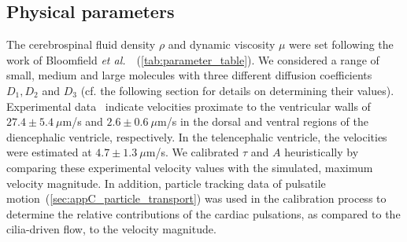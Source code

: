 \documentclass[fleqn]{wlscirep}
\begin{document}
\subsection*{Physical parameters}\label{subsec:parameters}
The cerebrospinal fluid density $\rho$ and dynamic viscosity $\mu$ were set following the work of Bloomfield \textit{et al.}~\cite{Bloomfield1998EffectsFluid}~(\cref{tab:parameter_table}). We considered a range of small, medium and large molecules with three different diffusion coefficients $D_1, D_2$ and $D_3$ (cf. the following section for details on determining their values). Experimental data~\cite{Olstad2019CiliaryDevelopment} indicate velocities proximate to the ventricular walls of $27.4 \pm 5.4 \ \mu$m/s and $2.6 \pm 0.6 \ \mu$m/s in the dorsal and ventral regions of the diencephalic ventricle, respectively. In the telencephalic ventricle, the velocities were estimated at $4.7 \pm 1.3 \ \mu$m/s. We calibrated $\tau$ and $A$ heuristically by comparing these experimental velocity values with the simulated, maximum velocity magnitude. In addition, particle tracking data of pulsatile motion~(\cref{sec:appC_particle_transport}) was used in the calibration process to determine the relative contributions of the cardiac pulsations, as compared to the cilia-driven flow, to the velocity magnitude.
\end{document}
